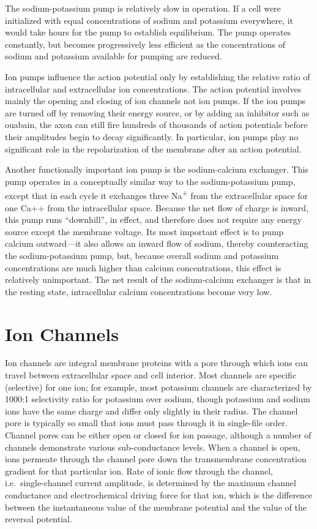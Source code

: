 The sodium-potassium pump is relatively slow in operation. If a cell were initialized with equal concentrations of sodium and potassium everywhere, it would take hours for the pump to establish equilibrium. The pump operates constantly, but becomes progressively less efficient as the concentrations of sodium and potassium available for pumping are reduced.

Ion pumps influence the action potential only by establishing the relative ratio of intracellular and extracellular ion concentrations. The action potential involves mainly the opening and closing of ion channels not ion pumps. If the ion pumps are turned off by removing their energy source, or by adding an inhibitor such as ouabain, the axon can still fire hundreds of thousands of action potentials before their amplitudes begin to decay significantly. In particular, ion pumps play no significant role in the repolarization of the membrane after an action potential.

Another functionally important ion pump is the sodium-calcium exchanger. This pump operates in a conceptually similar way to the sodium-potassium pump, except that in each cycle it exchanges three Na\textsuperscript{+} from the extracellular space for one Ca++ from the intracellular space. Because the net flow of charge is inward, this pump runs ``downhill'', in effect, and therefore does not require any energy source except the membrane voltage. Its most important effect is to pump calcium outward---it also allows an inward flow of sodium, thereby counteracting the sodium-potassium pump, but, because overall sodium and potassium concentrations are much higher than calcium concentrations, this effect is relatively unimportant. The net result of the sodium-calcium exchanger is that in the resting state, intracellular calcium concentrations become very low.

\hypertarget{ion-channels}{%
\section{Ion Channels}\label{ion-channels}}

Ion channels are integral membrane proteins with a pore through which ions can travel between extracellular space and cell interior. Most channels are specific (selective) for one ion; for example, most potassium channels are characterized by 1000:1 selectivity ratio for potassium over sodium, though potassium and sodium ions have the same charge and differ only slightly in their radius. The channel pore is typically so small that ions must pass through it in single-file order. Channel pores can be either open or closed for ion passage, although a number of channels demonstrate various sub-conductance levels. When a channel is open, ions permeate through the channel pore down the transmembrane concentration gradient for that particular ion. Rate of ionic flow through the channel, i.e.~single-channel current amplitude, is determined by the maximum channel conductance and electrochemical driving force for that ion, which is the difference between the instantaneous value of the membrane potential and the value of the reversal potential.

